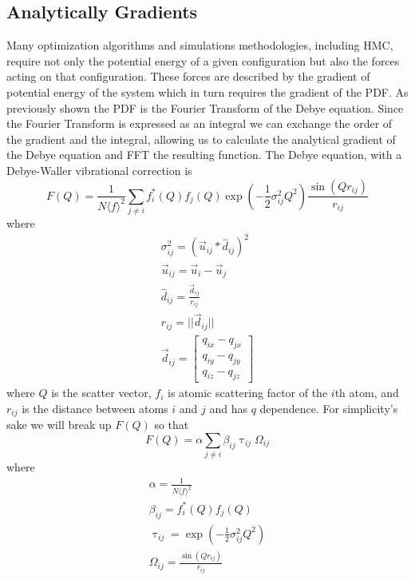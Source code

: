 \subsection{Analytically Gradients}
Many optimization algorithms and simulations methodologies, including HMC, require not only the potential energy of a given configuration but also the forces acting on that configuration.
These forces are described by the gradient of potential energy of the system which in turn requires the gradient of the PDF.
As previously shown the PDF is the Fourier Transform of the Debye equation.
Since the Fourier Transform is expressed as an integral we can exchange the order of the gradient and the integral, allowing us to calculate the analytical gradient of the Debye equation and FFT the resulting function.
The Debye equation, with a Debye-Waller vibrational correction is
\begin{equation}
F(Q) = \frac{1}{N \langle f \rangle^{2}} \sum_{j\neq i} f_i^{*}(Q)f_j(Q) \exp(-\frac{1}{2}\sigma_{ij}^{2}Q^{2}) \frac{\sin(Qr_{ij})}{r_{ij}}
\end{equation}
where
\begin{eqnarray}
  \sigma_{ij}^{2} = (\vec{u}_{ij} * \hat{d}_{ij})^{2}\\
  \vec{u}_{ij} = \vec{u}_{i} - \vec{u}_{j}\\
  \hat{d}_{ij} = \frac{\vec{d}_{ij}}{r_{ij}}\\
  r_{ij} = ||\vec{d}_{ij}|| \\
  \vec{d}_{ij} =
  \begin{bmatrix}
    q_{ix} - q_{jx}\\
    q_{iy} - q_{jy} \\
    q_{iz} - q_{jz}
  \end{bmatrix}
\end{eqnarray}
where $Q$ is the scatter vector, $f_i$ is atomic scattering factor of the $i$th atom, and $r_{ij}$ is the distance between atoms $i$ and $j$ and has $q$ dependence. \cite{Jeong2002}
For simplicity's sake we will break up $F(Q)$ so that
\begin{equation}
F(Q) = \alpha \sum_{j\neq i} \beta_{ij} \uptau_{ij} \Omega_{ij} \label{eq:abto}
\end{equation}
where
\begin{eqnarray}
  \alpha = \frac{1}{N \langle f \rangle^{2}} \label{eq:alpha} \\
  \beta_{ij} = f_i^{*}(Q)f_j(Q)\label{eq:beta}\\
  \uptau_{ij} = \exp(-\frac{1}{2}\sigma_{ij}^{2}Q^{2}) \label{eq:tau}\\
  \Omega_{ij} = \frac{\sin(Qr_{ij})}{r_{ij}} \label{eq:omega}
\end{eqnarray}

